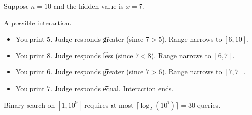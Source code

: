 Suppose $n = 10$ and the hidden value is $x = 7$.

A possible interaction:
\begin{itemize}
    \item You print $5$. Judge responds \t{greater} (since $7 > 5$). Range narrows to $[6, 10]$.
    \item You print $8$. Judge responds \t{less} (since $7 < 8$). Range narrows to $[6, 7]$.
    \item You print $6$. Judge responds \t{greater} (since $7 > 6$). Range narrows to $[7, 7]$.
    \item You print $7$. Judge responds \t{equal}. Interaction ends.
\end{itemize}

Binary search on $[1, 10^9]$ requires at most $\lceil \log_2(10^9) \rceil = 30$ queries.
